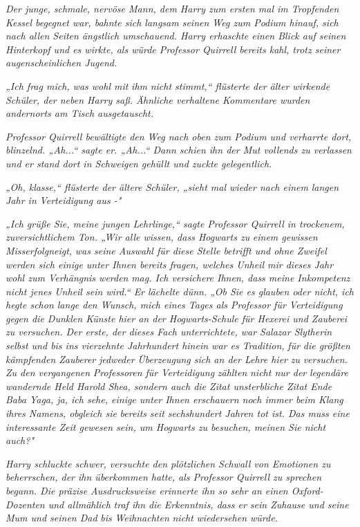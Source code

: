 {\emph{Der junge, schmale, nervöse Mann, dem Harry zum ersten mal im Tropfenden Kessel begegnet war, bahnte sich langsam seinen Weg zum Podium hinauf, sich nach allen Seiten ängstlich umschauend. Harry erhaschte einen Blick auf seinen Hinterkopf und es wirkte, als würde Professor Quirrell bereits kahl, trotz seiner augenscheinlichen Jugend.}

\emph{„Ich frag mich, was wohl mit} \emph{\emph{ihm}} \emph{nicht stimmt,“ flüsterte der älter wirkende Schüler, der neben Harry saß. Ähnliche verhaltene Kommentare wurden andernorts am Tisch ausgetauscht.}

\emph{Professor Quirrell bewältigte den Weg nach oben zum Podium und verharrte dort, blinzelnd. „Ah...“ sagte er. „Ah...“ Dann schien ihn der Mut vollends zu verlassen und er stand dort in Schweigen gehüllt und zuckte gelegentlich.}

\emph{„Oh, klasse,“ flüsterte der ältere Schüler, „sieht mal wieder nach einem} \emph{\emph{langen}} \emph{Jahr in} \emph{Verteidigung aus -"}

\emph{„Ich grüße Sie, meine jungen Lehrlinge,“ sagte Professor Quirrell in trockenem, zuversichtlichem Ton. „Wir alle wissen, dass Hogwarts zu} \emph{einem gewissen} \emph{\emph{Misserfolg}neigt,} \emph{was seine Auswahl für diese Stelle betrifft und ohne Zweifel werden sich einige unter Ihnen bereits fragen, welches Unheil mir dieses Jahr wohl zum Verhängnis werden} \emph{mag. Ich versichere Ihnen, dass meine Inkompetenz nicht jenes Unheil sein wird.“ Er lächelte dünn. „Ob Sie es glauben oder nicht, ich hegte schon lange den Wunsch, mich eines Tages als Professor für Verteidigung gegen die Dunklen Künste hier an der Hogwarts-Schule für Hexerei und Zauberei zu versuchen. Der erste, der dieses Fach unterrichtete, war Salazar Slytherin selbst und bis ins vierzehnte Jahrhundert hinein war es Tradition,} \emph{für} \emph{die größten kämpfenden Zauberer} \emph{jedweder} \emph{Überzeugung sich an der Lehre hier} \emph{zu} \emph{versuchen.} \emph{Zu den vergangenen} \emph{Professoren für Verteidigung} \emph{zählten} \emph{nicht nur der} \emph{legendäre wandernde Held Harold Shea, sondern auch die Zitat unsterbliche Zitat Ende Baba Yaga, ja, ich sehe, einige unter Ihnen erschauern noch immer beim Klang ihres Namens, obgleich sie} \emph{bereits} \emph{seit sechshundert Jahren tot ist. Das muss eine interessante Zeit gewesen sein, um Hogwarts zu besuchen, meinen Sie nicht auch?"}

\emph{Harry schluckte schwer, versuchte den plötzlichen Schwall von Emotionen zu beherrschen, der ihn überkommen hatte, als Professor Quirrell zu sprechen begann. Die präzise Ausdrucksweise erinnerte ihn so sehr an einen Oxford-Dozenten und allmählich} \emph{traf ihn} \emph{die Erkenntnis, dass er sein Zuhause und seine Mum und seinen Dad} \emph{bis} \emph{Weihnachten} \emph{nicht} \emph{wiedersehen würde.}

}
